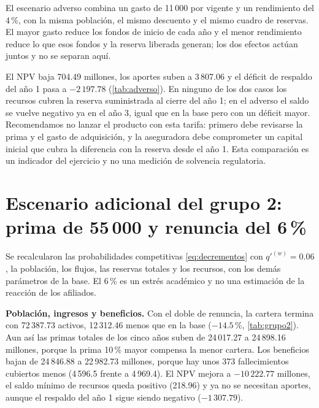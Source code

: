 \documentclass[10pt,a4paper]{article}
\numberwithin{equation}{section}
\newcommand{\tabla}[1]{}
\newcommand{\um}{u.m.}
\begin{document}
	El escenario adverso combina un gasto de 11\,000 por vigente y un rendimiento del 4\,\%, con la misma población, el mismo descuento y el mismo cuadro de reservas. El mayor gasto reduce los fondos de inicio de cada año y el menor rendimiento reduce lo que esos fondos y la reserva liberada generan; los dos efectos actúan juntos y no se separan aquí.

	\begin{table}[htbp]
		\centering\small
		\tabla{D_base_adverso}
		\caption{Comparación entre la base y el escenario adverso (gasto de 11\,000 y rendimiento del 4\,\%), en millones de \um\ El respaldo del año 1 es \(\widetilde F_1-V_1\), antes del aporte.}\label{tab:adverso}
	\end{table}

	El NPV baja 704.49 millones, los aportes suben a 3\,807.06 y el déficit de respaldo del año 1 pasa a \(-2\,197.78\) (\cref{tab:adverso}). En ninguno de los dos casos los recursos cubren la reserva suministrada al cierre del año 1; en el adverso el saldo se vuelve negativo ya en el año 3, igual que en la base pero con un déficit mayor. Recomendamos no lanzar el producto con esta tarifa: primero debe revisarse la prima y el gasto de adquisición, y la aseguradora debe comprometer un capital inicial que cubra la diferencia con la reserva desde el año 1. Esta comparación es un indicador del ejercicio y no una medición de solvencia regulatoria.

	\section*{Escenario adicional del grupo 2: prima de 55\,000 y renuncia del 6\,\%}\label{sec:grupo2}

	Se recalcularon las probabilidades competitivas \eqref{eq:decrementos} con \(q'^{(w)}=0.06\), la población, los flujos, las reservas totales y los recursos, con los demás parámetros de la base. El 6\,\% es un estrés académico y no una estimación de la reacción de los afiliados.

	\begin{table}[htbp]
		\centering\small
		\tabla{S4_base_grupo2}
		\caption{Caso base frente al escenario del grupo 2 (prima de 55\,000 y renuncia del 6\,\%).}\label{tab:grupo2}
	\end{table}

	\textbf{Población, ingresos y beneficios.} Con el doble de renuncia, la cartera termina con 72\,387.73 activos, 12\,312.46 menos que en la base (\(-14.5\,\%\), \cref{tab:grupo2}). Aun así las primas totales de los cinco años suben de 24\,017.27 a 24\,898.16 millones, porque la prima 10\,\% mayor compensa la menor cartera. Los beneficios bajan de 24\,846.88 a 22\,982.73 millones, porque hay unos 373 fallecimientos cubiertos menos (4\,596.5 frente a 4\,969.4). El NPV mejora a \(-10\,222.77\) millones, el saldo mínimo de recursos queda positivo (218.96) y ya no se necesitan aportes, aunque el respaldo del año 1 sigue siendo negativo (\(-1\,307.79\)).
\end{document}

